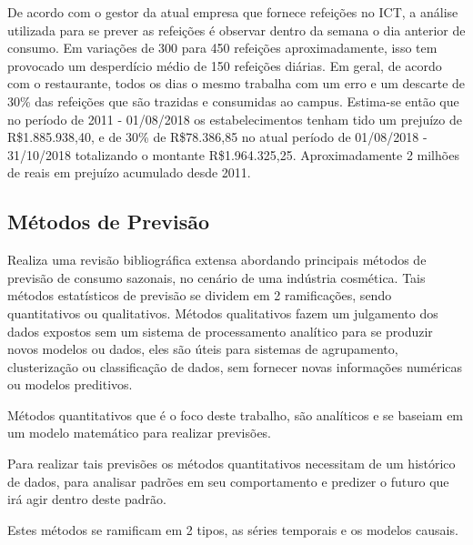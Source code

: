 \documentclass[	12pt, Times, openright, twoside, a4paper, english, brazil]{abntex2}
\begin{document}
          De acordo com o gestor da atual empresa que fornece refeições no ICT, a análise utilizada para se prever as refeições é observar dentro da semana o dia anterior de consumo. Em variações de 300 para 450 refeições aproximadamente, isso tem provocado um desperdício médio de 150 refeições diárias. Em geral, de acordo com o restaurante, todos os dias o mesmo trabalha com um erro e um descarte de 30\% das refeições que são trazidas e consumidas ao campus. Estima-se então que no período de 2011 - 01/08/2018 os estabelecimentos tenham tido um prejuízo de R\$1.885.938,40, e de 30\% de R\$78.386,85 no atual período de 01/08/2018 - 31/10/2018 totalizando o montante  R\$1.964.325,25. Aproximadamente 2 milhões de reais em prejuízo acumulado desde 2011.

        \subsection{Métodos de Previsão} 

          \cite{Junior2007} Realiza uma revisão bibliográfica extensa abordando principais métodos de previsão de consumo sazonais, no cenário de uma indústria cosmética. Tais métodos estatísticos de previsão se dividem em 2 ramificações, sendo quantitativos ou qualitativos. Métodos qualitativos fazem um julgamento dos dados expostos sem um sistema de processamento analítico para se produzir novos modelos ou dados, eles são úteis para sistemas de agrupamento, clusterização ou classificação de dados, sem fornecer novas informações numéricas ou modelos preditivos.

          Métodos quantitativos que é o foco deste trabalho, são analíticos e se baseiam em um modelo matemático para realizar previsões. 

          Para realizar tais previsões os métodos quantitativos necessitam de um histórico de dados, para analisar padrões em seu comportamento e predizer o futuro que irá agir dentro deste padrão.

          Estes métodos se ramificam em 2 tipos, as séries temporais e os modelos causais.
          \begin{figure}[H]
          \end{figure}
\end{document}
